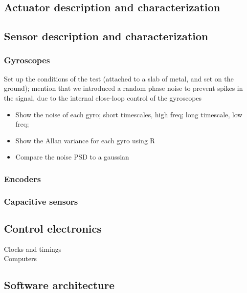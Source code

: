 \subsection{Actuator description and characterization}
\subsection{Sensor description and characterization}
\subsubsection{Gyroscopes}
Set up the conditions of the test (attached to a slab of metal, and set on the ground); mention that we introduced a random phase noise to prevent spikes in the signal, due to the internal close-loop control of the gyroscopes
\begin{itemize}
\item Show the noise of each gyro; short timescales, high freq; long timescale, low freq;
\item Show the Allan variance for each gyro using R
\item Compare the noise PSD to a gaussian
\end{itemize}
\subsubsection{Encoders}
\subsubsection{Capacitive sensors}
\subsubsection{}
\subsection{Control electronics}
Clocks and timings \\
Computers
\subsection{Software architecture}
